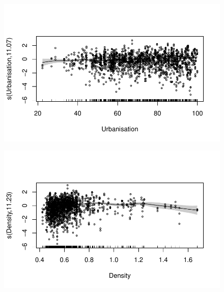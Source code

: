 \documentclass[
  letterpaper,
  DIV=11,
  numbers=noendperiod]{scrartcl}
\begin{document}
\begin{figure}[H]

{\centering \includegraphics{Group34Coursework_files/figure-pdf/unnamed-chunk-17-3.pdf}

}

\end{figure}

\begin{figure}[H]

{\centering \includegraphics{Group34Coursework_files/figure-pdf/unnamed-chunk-17-4.pdf}

}

\end{figure}
\end{document}
